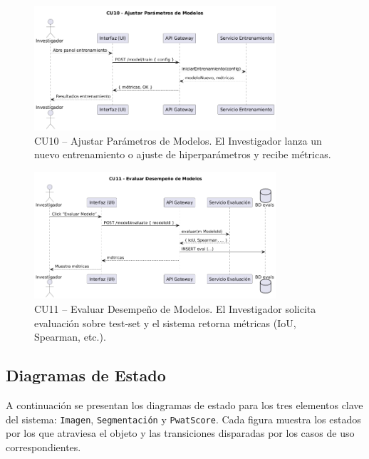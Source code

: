 \begin{figure}[H]
  \centering
  \includegraphics[width=0.8\textwidth]{imagenes/cu10_seq.png}
  \caption{CU10 – Ajustar Parámetros de Modelos. El Investigador lanza un nuevo entrenamiento o ajuste de hiperparámetros y recibe métricas.}
  \label{fig:cu10_seq}
\end{figure}

\begin{figure}[H]
  \centering
  \includegraphics[width=0.8\textwidth]{imagenes/cu11_seq.png}
  \caption{CU11 – Evaluar Desempeño de Modelos. El Investigador solicita evaluación sobre test‐set y el sistema retorna métricas (IoU, Spearman, etc.).}
  \label{fig:cu11_seq}
\end{figure}

\subsection{Diagramas de Estado}
\label{ssc:DE}

A continuación se presentan los diagramas de estado para los tres elementos clave del sistema: \texttt{Imagen}, \texttt{Segmentación} y \texttt{PwatScore}. Cada figura muestra los estados por los que atraviesa el objeto y las transiciones disparadas por los casos de uso correspondientes.

